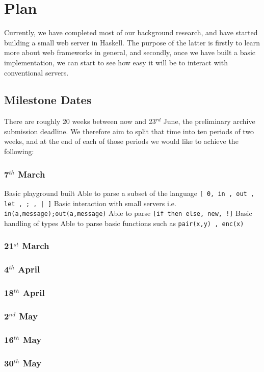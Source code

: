 \section{Plan}

Currently, we have completed most of our background research, and have started building a small web server in Haskell. The purpose of the latter is firstly to learn more about web frameworks in general, and secondly, once we have built a basic implementation, we can start to see how easy it will be to interact with conventional servers.

\subsection{Milestone Dates}

There are roughly 20 weeks between now and 23$^{rd}$ June, the preliminary archive submission deadline. We therefore aim to split that time into ten periods of two weeks, and at the end of each of those periods we would like to achieve the following:
\subsubsection{7$^{th}$ March} 
Basic playground built    
Able to parse a subset of the language \verb![ 0, in , out , let , ; , | ]! 
Basic interaction with small servers i.e. \verb!in(a,message);out(a,message)!   
Able to parse \verb?[if then else, new, !]?    
Basic handling of types  
Able to parse basic functions such as \verb!pair(x,y) , enc(x)!  

\subsubsection{21$^{st}$ March}
\subsubsection{4$^{th}$ April}  
\subsubsection{18$^{th}$ April}
\subsubsection{2$^{nd}$ May}    
\subsubsection{16$^{th}$ May}   
\subsubsection{30$^{th}$ May}     
